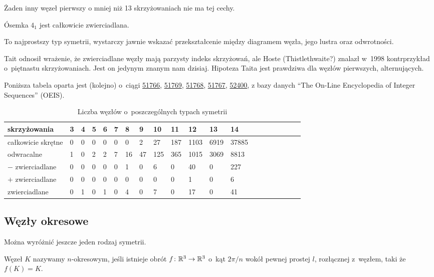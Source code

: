 Żaden inny węzeł pierwszy o mniej niż 13 skrzyżowaniach nie ma tej cechy.

\begin{example}
    Ósemka $4_1$ jest całkowicie zwierciadlana.
\end{example}

To najprostszy typ symetrii, wystarczy jawnie wskazać przekształcenie między diagramem węzła, jego lustra oraz odwrotności.

Tait odnosił wrażenie, że zwierciadlane węzły mają parzysty indeks skrzyżowań,
ale Hoste (Thistlethwaite?) znalazł w~1998 kontrprzykład o~piętnastu skrzyżowaniach.
Jest on jedynym znanym nam dzisiaj.
Hipoteza Taita jest prawdziwa dla węzłów pierwszych, alternujących.

Poniższa tabela oparta jest (kolejno) o~ciągi
\href{https://oeis.org/A051766}{51766},
\href{https://oeis.org/A051769}{51769},
\href{https://oeis.org/A051768}{51768},
\href{https://oeis.org/A051767}{51767},
\href{https://oeis.org/A052400}{52400},
z bazy danych ``The On-Line Encyclopedia of Integer Sequences'' (OEIS).

\begin{table}[h]
    \centering
    \begin{tabular}{@{}*{20}l@{}} \toprule
        skrzyżowania & 3 & 4 & 5 & 6 & 7 & 8 & 9 & 10 & 11 & 12 & 13 & 14 \\ \midrule
        całkowicie skrętne & 0 & 0 & 0 & 0 & 0 & 0 & 2 & 27 & 187 & 1103 & 6919 & 37885 \\
        odwracalne & 1 & 0 & 2 & 2 & 7 & 16 & 47 & 125 & 365 & 1015 & 3069 & 8813 \\
        $-$ zwierciadlane & 0 & 0 & 0 & 0 & 0 & 1 & 0 & 6 & 0 & 40 & 0 & 227 \\
        $+$ zwierciadlane & 0 & 0 & 0 & 0 & 0 & 0 & 0 & 0 & 0 & 1 & 0 & 6 \\
        zwierciadlane & 0 & 1 & 0 & 1 & 0 & 4 & 0 & 7 & 0 & 17 & 0 & 41 \\
        \bottomrule
        \hline
    \end{tabular}
    \caption{Liczba węzłów o~poszczególnych typach symetrii}
\end{table}

\subsection{Węzły okresowe}
Można wyróżnić jeszcze jeden rodzaj symetrii.

\begin{definition}
    \label{def:period}
    Węzeł $K$ nazywamy $n$-okresowym, jeśli istnieje obrót $f \colon \mathbb R^3 \to \mathbb R^3$ o~kąt $2\pi/n$ wokół pewnej prostej $l$, rozłącznej z~węzłem, taki że $f(K) = K$.
\end{definition}

